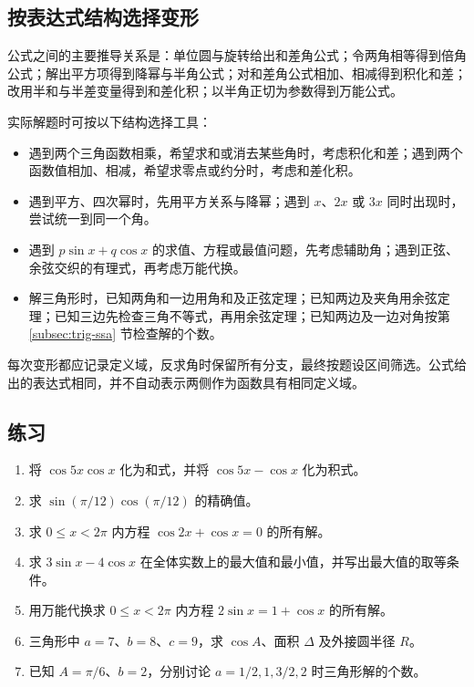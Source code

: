 \documentclass[UTF8]{ctexart}
\begin{document}
\subsection{按表达式结构选择变形}

公式之间的主要推导关系是：单位圆与旋转给出和差角公式；令两角相等得到倍角公式；解出平方项得到降幂与半角公式；对和差角公式相加、相减得到积化和差；改用半和与半差变量得到和差化积；以半角正切为参数得到万能公式。

实际解题时可按以下结构选择工具：
\begin{itemize}
  \item 遇到两个三角函数相乘，希望求和或消去某些角时，考虑积化和差；遇到两个函数值相加、相减，希望求零点或约分时，考虑和差化积。
  \item 遇到平方、四次幂时，先用平方关系与降幂；遇到 $x$、$2x$ 或 $3x$ 同时出现时，尝试统一到同一个角。
  \item 遇到 $p\sin x+q\cos x$ 的求值、方程或最值问题，先考虑辅助角；遇到正弦、余弦交织的有理式，再考虑万能代换。
  \item 解三角形时，已知两角和一边用角和及正弦定理；已知两边及夹角用余弦定理；已知三边先检查三角不等式，再用余弦定理；已知两边及一边对角按第 \ref{subsec:trig-ssa} 节检查解的个数。
\end{itemize}
每次变形都应记录定义域，反求角时保留所有分支，最终按题设区间筛选。公式给出的表达式相同，并不自动表示两侧作为函数具有相同定义域。

\subsection{练习}

\begin{enumerate}
  \item 将 $\cos5x\cos x$ 化为和式，并将 $\cos5x-\cos x$ 化为积式。
  \item 求 $\sin(\pi/12)\cos(\pi/12)$ 的精确值。
  \item 求 $0\le x<2\pi$ 内方程 $\cos2x+\cos x=0$ 的所有解。
  \item 求 $3\sin x-4\cos x$ 在全体实数上的最大值和最小值，并写出最大值的取等条件。
  \item 用万能代换求 $0\le x<2\pi$ 内方程 $2\sin x=1+\cos x$ 的所有解。
  \item 三角形中 $a=7$、$b=8$、$c=9$，求 $\cos A$、面积 $\Delta$ 及外接圆半径 $R$。
  \item 已知 $A=\pi/6$、$b=2$，分别讨论 $a=1/2,1,3/2,2$ 时三角形解的个数。
\end{enumerate}
\end{document}

